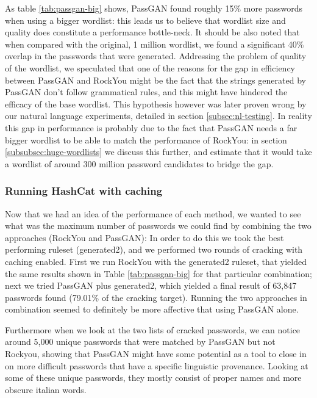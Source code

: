 As table \ref{tab:passgan-big} shows, PassGAN found roughly 15\% more passwords when using a bigger wordlist: this leads us to believe that wordlist size and quality does constitute a performance bottle-neck. It should be also noted that when compared with the original, 1 million wordlist, we found a significant 40\% overlap in the passwords that were generated. Addressing the problem of quality of the wordlist, we speculated that one of the reasons for the gap in efficiency between PassGAN and RockYou might be the fact that the strings generated by PassGAN don't follow grammatical rules, and this might have hindered the efficacy of the base wordlist. This hypothesis however was later proven wrong by our natural language experiments, detailed in section \ref{subsec:nl-testing}. In reality this gap in performance is probably due to the fact that PassGAN needs a far bigger wordlist to be able to match the performance of RockYou: in section \ref{subsubsec:huge-wordlists} we discuss this further, and estimate that it would take a wordlist of around 300 million password candidates to bridge the gap.

\subsubsection{Running HashCat with caching}\label{subsubsec:potfile-enable}
Now that we had an idea of the performance of each method, we wanted to see what was the maximum number of passwords we could find by combining the two approaches (RockYou and PassGAN):
In order to do this we took the best performing ruleset (generated2), and we performed two rounds of cracking with caching enabled. First we run RockYou with the generated2 ruleset, that yielded the same results shown in Table \ref{tab:passgan-big} for that particular combination; next we tried PassGAN plus generated2, which yielded a final result of 63,847 passwords found (79.01\% of the cracking target). Running the two approaches in combination seemed to definitely be more affective that using PassGAN alone.

Furthermore when we look at the two lists of cracked passwords, we can notice around 5,000 unique passwords that were matched by PassGAN but not Rockyou, showing that PassGAN might have some potential as a tool to close in on more difficult passwords that have a specific linguistic provenance. Looking at some of these unique passwords, they mostly consist of proper names and more obscure italian words.


